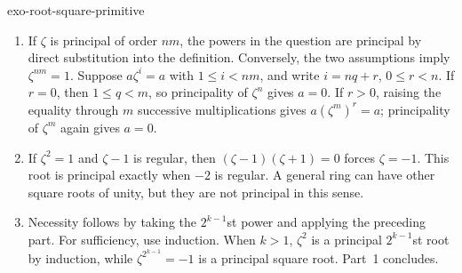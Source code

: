 \begin{correction}{exo-root-square-primitive}
\begin{enumerate}
\item If $\zeta$ is principal of order $nm$, the powers in the question
are principal by direct substitution into the definition. Conversely,
the two assumptions imply $\zeta^{nm}=1$. Suppose $a\zeta^i=a$ with
$1\leq i<nm$, and write $i=nq+r$, $0\leq r<n$. If $r=0$, then
$1\leq q<m$, so principality of $\zeta^n$ gives $a=0$. If $r>0$,
raising the equality through $m$ successive multiplications gives
$a(\zeta^m)^r=a$; principality of $\zeta^m$ again gives $a=0$.
\item If $\zeta^2=1$ and $\zeta-1$ is regular, then
$(\zeta-1)(\zeta+1)=0$ forces $\zeta=-1$. This root is principal
exactly when $-2$ is regular. A general ring can have other square roots
of unity, but they are not principal in this sense.
\item Necessity follows by taking the $2^{k-1}$st power and applying the
preceding part. For sufficiency, use induction. When $k>1$, $\zeta^2$
is a principal $2^{k-1}$st root by induction, while
$\zeta^{2^{k-1}}=-1$ is a principal square root. Part~1 concludes.
\end{enumerate}
\end{correction}


